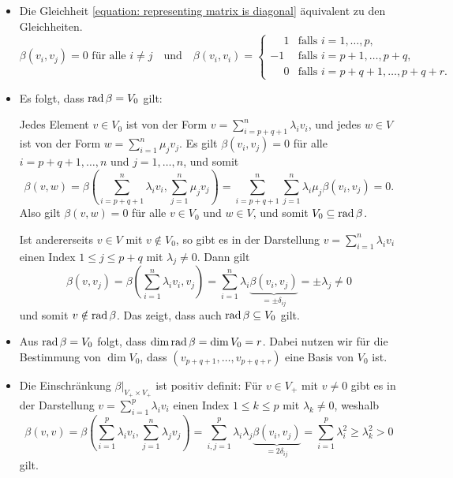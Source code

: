 \documentclass[a4paper, 10pt, numbers = noenddot]{scrartcl}
\begin{document}
\begin{itemize}
  \item
    Die Gleichheit \eqref{equation: representing matrix is diagonal} äquivalent zu den Gleichheiten.
    \[
      \text{$\beta(v_i, v_j) = 0$ für alle $i \neq j$}
      \quad\text{und}\quad
        \beta(v_i, v_i)
      = \begin{cases}
          \phantom{-}1  & \text{falls $i = 1, \dotsc, p$},        \\
                    -1  & \text{falls $i = p+1, \dotsc, p+q$},    \\
          \phantom{-}0  & \text{falls $i = p+q+1, \dotsc, p+q+r$}.
        \end{cases}
    \]
  \item
    Es folgt, dass $\operatorname{rad} \beta = V_0$ gilt:
    
    Jedes Element $v \in V_0$ ist von der Form $v = \sum_{i=p+q+1}^n \lambda_i v_i$,
    und jedes $w \in V$ ist von der Form $w = \sum_{i=1}^n \mu_j v_j$.
    Es gilt $\beta(v_i, v_j) = 0$ für alle $i = p+q+1, \dotsc, n$ und $j = 1, \dotsc, n$, und somit
    \[
        \beta(v, w)
      = \beta\left( \sum_{i = p+q+1}^n \lambda_i v_i, \sum_{j = 1}^n \mu_j v_j \right)
      = \sum_{i = p+q+1}^n \sum_{j = 1}^n \lambda_i \mu_j \beta(v_i, v_j)
      = 0.
    \]
    Also gilt $\beta(v, w) = 0$ für alle $v \in V_0$ und $w \in V$, und somit $V_0 \subseteq \operatorname{rad} \beta$.
    
    Ist andererseits $v \in V$ mit $v \notin V_0$, so gibt es in der Darstellung $v = \sum_{i=1}^n \lambda_i v_i$ einen Index $1 \leq j \leq p + q$ mit $\lambda_j \neq 0$.
    Dann gilt
    \[
            \beta(v, v_j)
      =     \beta\left( \sum_{i=1}^n \lambda_i v_i, v_j \right)
      =     \sum_{i=1}^n \lambda_i \underbrace{\beta(v_i, v_j)}_{= \pm \delta_{ij}}
      =     \pm \lambda_j
      \neq  0
    \]
    und somit $v \notin \operatorname{rad} \beta$.
    Das zeigt, dass auch $\operatorname{rad} \beta \subseteq V_0$ gilt.
    
  \item
    Aus $\operatorname{rad} \beta = V_0$ folgt, dass $\dim \operatorname{rad} \beta = \dim V_0 = r$.
    Dabei nutzen wir für die Bestimmung von $\dim V_0$, dass $(v_{p+q+1}, \dotsc, v_{p+q+r})$ eine Basis von $V_0$ ist.
  
  \item
    Die Einschränkung $\beta|_{V_+ \times V_+}$ ist positiv definit:
    Für $v \in V_+$ mit $v \neq 0$ gibt es in der Darstellung $v = \sum_{i=1}^p \lambda_i v_i$ einen Index $1 \leq k \leq p$ mit $\lambda_k \neq 0$, weshalb
    \[
            \beta(v, v)
      =     \beta\left( \sum_{i=1}^p \lambda_i v_i, \sum_{j=1}^n \lambda_j v_j \right)
      =     \sum_{i, j = 1}^p \lambda_i \lambda_j \underbrace{ \beta(v_i, v_j) }_{=2 \delta_{ij}}
      =     \sum_{i=1}^p \lambda_i^2
      \geq  \lambda_k^2
      >     0
    \]
    gilt.
    

\end{itemize}
\end{document}
